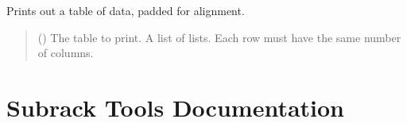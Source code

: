 \documentclass[letterpaper,10pt,english]{sphinxmanual}
\begin{document}
\begin{fulllineitems}

\pysigstartsignatures
{}
\pysigstopsignatures
\sphinxAtStartPar
Prints out a table of data, padded for alignment.
\begin{quote}\begin{description}
\sphinxAtStartPar
{} () \textendash{} The table to print. A list of lists.
Each row must have the same number of columns.

\end{description}\end{quote}

\end{fulllineitems}


\sphinxstepscope


\chapter{Subrack Tools Documentation}
\label{\detokenize{toolsdocs:module-power_on_tpm}}\label{\detokenize{toolsdocs:subrack-tools-documentation}}\label{\detokenize{toolsdocs::doc}}
\end{document}
